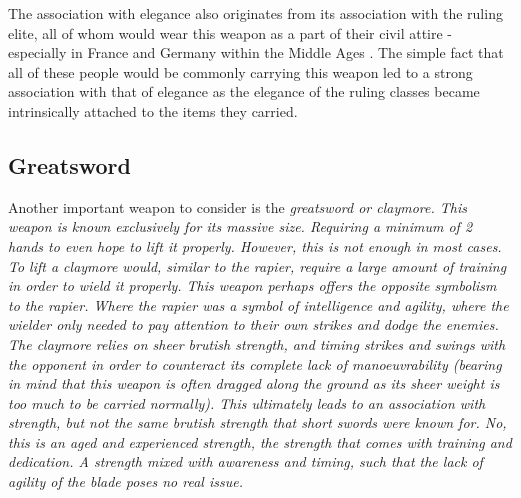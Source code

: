 \documentclass{article}
\begin{document}
The association with elegance also originates from its association with the ruling elite, all of whom would wear this weapon as a part of their civil attire - especially in France and Germany within the Middle Ages \parencite{correa2013history}. The simple fact that all of these people would be commonly carrying this weapon led to a strong association with that of elegance as the elegance of the ruling classes became intrinsically attached to the items they carried.

\subsection*{Greatsword}
Another important weapon to consider is the \em{greatsword or claymore}. This weapon is known exclusively for its massive size. Requiring a minimum of 2 hands to even hope to lift it properly. However, this is not enough in most cases. To lift a claymore would, similar to the rapier, require a large amount of training in order to wield it properly. This weapon perhaps offers the opposite symbolism to the rapier. Where the rapier was a symbol of intelligence and agility, where the wielder only needed to pay attention to their own strikes and dodge the enemies. The claymore relies on sheer brutish strength, and timing strikes and swings with the opponent in order to counteract its complete lack of manoeuvrability (bearing in mind that this weapon is often dragged along the ground as its sheer weight is too much to be carried normally). This ultimately leads to an association with strength, but not the same brutish strength that short swords were known for. No, this is an aged and experienced strength, the strength that comes with training and dedication. A strength mixed with awareness and timing, such that the lack of agility of the blade poses no real issue.

\pagebreak


\printbibliography
\end{document}
